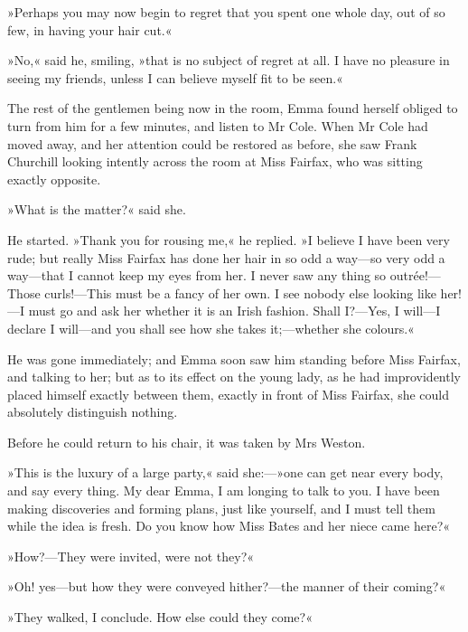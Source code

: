 »Perhaps you may now begin to regret that you spent one whole day, out of so few, in having your hair cut.«

»No,« said he, smiling, »that is no subject of regret at all. I have no pleasure in seeing my friends, unless I can believe myself fit to be seen.«

The rest of the gentlemen being now in the room, Emma found herself obliged to turn from him for a few minutes, and listen to Mr Cole. When Mr Cole had moved away, and her attention could be restored as before, she saw Frank Churchill looking intently across the room at Miss Fairfax, who was sitting exactly opposite.

»What is the matter?« said she.

He started. »Thank you for rousing me,« he replied. »I believe I have been very rude; but really Miss Fairfax has done her hair in so odd a way—so very odd a way—that I cannot keep my eyes from her. I never saw any thing so outrée!—Those curls!—This must be a fancy of her own. I see nobody else looking like her!—I must go and ask her whether it is an Irish fashion. Shall I?—Yes, I will—I declare I will—and you shall see how she takes it;—whether she colours.«

He was gone immediately; and Emma soon saw him standing before Miss Fairfax, and talking to her; but as to its effect on the young lady, as he had improvidently placed himself exactly between them, exactly in front of Miss Fairfax, she could absolutely distinguish nothing.

Before he could return to his chair, it was taken by Mrs Weston.

»This is the luxury of a large party,« said she:—»one can get near every body, and say every thing. My dear Emma, I am longing to talk to you. I have been making discoveries and forming plans, just like yourself, and I must tell them while the idea is fresh. Do you know how Miss Bates and her niece came here?«

»How?—They were invited, were not they?«

»Oh! yes—but how they were conveyed hither?—the manner of their coming?«

»They walked, I conclude. How else could they come?«

